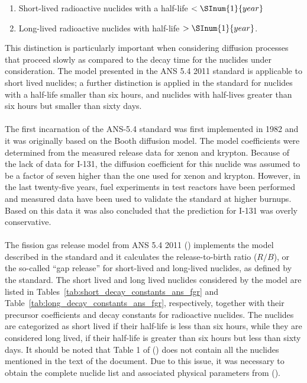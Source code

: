 \begin{enumerate}
    \item Short-lived radioactive nuclides with a half-life $ < \SInum{1}{year}$ 
    \item Long-lived radioactive nuclides with half-life $ > \SInum{1}{year}$. 
\end{enumerate}

This distinction is particularly important when considering diffusion processes that proceed slowly
as compared to the decay time for the nuclides under consideration.  The model presented in the ANS
5.4 2011 standard is applicable to short lived nuclides; a further distinction is applied in the
standard for nuclides with a half-life smaller than six hours, and nuclides with half-lives greater
than six hours but smaller than sixty days.
\\
\\
The first incarnation of the ANS-5.4 standard was first implemented in 1982 and it was originally
based on the Booth diffusion model. The model coefficients were determined from the measured release
data for xenon and krypton. Because of the lack of data for I-131, the diffusion coefficient for
this nuclide was assumed to be a factor of seven higher than the one used for xenon and krypton.
However, in the last twenty-five years, fuel experiments in test reactors have been performed and
measured data have been used to validate the standard at higher burnups. Based on this data it was
also concluded that the prediction for I-131 was overly conservative.
\\
\\
The fission gas release model from ANS 5.4 2011 (\cite{ref:ANS2011}) implements the model described
in the standard and it calculates the release-to-birth ratio ($R/B$), or the so-called ``gap
release'' for short-lived and long-lived nuclides, as defined by the standard. The short lived and
long lived nuclides considered by the model are listed in
Tables~\ref{tab:short_decay_constants_ans_fgr} and Table~\ref{tab:long_decay_constants_ans_fgr},
respectively, together with their precursor coefficients and decay constants for radioactive
nuclides. The nuclides are categorized as short lived if their half-life is less than six hours,
while they are considered long lived, if their half-life is greater than six hours but less than
sixty days. It should be noted that Table 1 of (\cite{ref:ANS2011}) does not contain all the
nuclides mentioned in the text of the document. Due to this issue, it was necessary to obtain the
complete nuclide list and associated physical parameters from (\cite{ref:Turnbull2010}).

